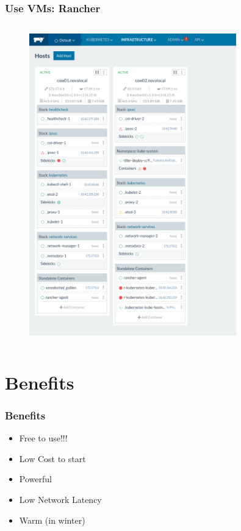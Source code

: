 \documentclass[aspectratio=169,11pt,hyperref={colorlinks=true}]{beamer}
\begin{document}
\begin{frame}
  \frametitle{Use VMs: Rancher}
  \begin{columns}[T]
    \begin{column}{1.0\textwidth}
      \begin{figure}
        \includegraphics[width=0.8\textwidth]{rancher.png}
      \end{figure}
    \end{column}
  \end{columns}
\end{frame}

\section{Benefits}
\begin{frame}
  \frametitle{Benefits}
  \begin{itemize}
    \item Free to use!!!
    \item Low Cost to start
    \item Powerful
    \item Low Network Latency
    \item Warm (in winter)
  \end{itemize}
\end{frame}
\end{document}
